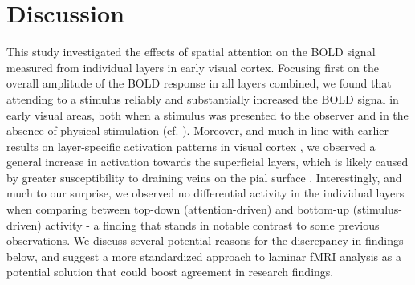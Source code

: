 \documentclass[9pt,lineno]{aperture}
\begin{document}
\begin{figure}
\label{figsupp:layerresults4layers}
\label{figsupp:layerresultsinterp}

\end{figure}

\section{Discussion}
This study investigated the effects of spatial attention on the BOLD signal measured from individual layers in early visual cortex. Focusing first on the overall amplitude of the BOLD response in all layers combined, we found that attending to a stimulus reliably and substantially increased the BOLD signal in early visual areas, both when a stimulus was presented to the observer and in the absence of physical stimulation (cf. \citep{Kastner1999,Murray2008,Li2008}). Moreover, and much in line with earlier results on layer-specific activation patterns in visual cortex \citep{Koopmans2010,Polimeni2010}, we observed a general increase in activation towards the superficial layers, which is likely caused by greater susceptibility to draining veins on the pial surface \citep{Koopmans2011}. Interestingly, and much to our surprise, we observed no differential activity in the individual layers when comparing between top-down (attention-driven) and bottom-up (stimulus-driven) activity - a finding that stands in notable contrast to some previous observations. We discuss several potential reasons for the discrepancy in findings below, and suggest a more standardized approach to laminar fMRI analysis as a potential solution that could boost agreement in research findings.
\end{document}
